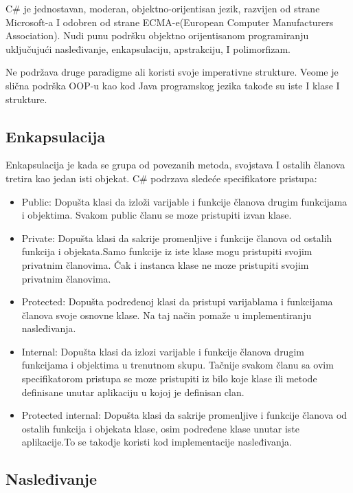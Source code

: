 \documentclass[a4paper]{article}
\begin{document}
C\# je jednostavan, moderan, objektno-orijentisan jezik, razvijen od strane Microsoft-a I  odobren od strane ECMA-e(European Computer Manufacturers Association).  Nudi punu podršku objektno orijentisanom programiranju uključujući nasleđivanje, enkapsulaciju, apstrakciju, I polimorfizam.

Ne podržava druge paradigme ali koristi svoje imperativne strukture. Veome je slična podrška OOP-u kao kod Java programskog jezika takođe su iste I klase I strukture.

\subsection{Enkapsulacija}
\label{subsec:csharpEnkapsulacija}

Enkapsulacija je kada se grupa od povezanih metoda, svojstava I ostalih članova tretira kao jedan isti objekat.
C\# podrzava sledeće specifikatore pristupa:
\begin{itemize}
\item Public:
Dopušta klasi da izloži varijable i funkcije članova drugim funkcijama i objektima. Svakom public članu se moze pristupiti izvan klase.

\item Private:
Dopušta klasi da sakrije promenljive i funkcije članova od ostalih funkcija i objekata.Samo funkcije iz iste klase mogu pristupiti svojim privatnim članovima.  Čak i instanca klase ne moze pristupiti svojim privatnim članovima.

\item Protected:
Dopušta podređenoj klasi da pristupi  varijablama i funkcijama članova svoje osnovne klase. Na taj način pomaže u implementiranju nasleđivanja.

\item Internal:
Dopušta klasi da izlozi varijable i funkcije članova drugim funkcijama i objektima u trenutnom skupu. Tačnije svakom članu sa ovim specifikatorom pristupa se moze pristupiti iz bilo koje klase ili metode definisane unutar aplikaciju u kojoj je definisan clan.

\item Protected internal:
Dopušta klasi da sakrije promenljive i funkcije članova od ostalih funkcija i objekata klase, osim podređene klase unutar iste aplikacije.To se takodje koristi kod implementacije nasleđivanja.
\end{itemize}

\subsection{Nasleđivanje}
\label{subsec:csharpNasledjivanje}
\end{document}
